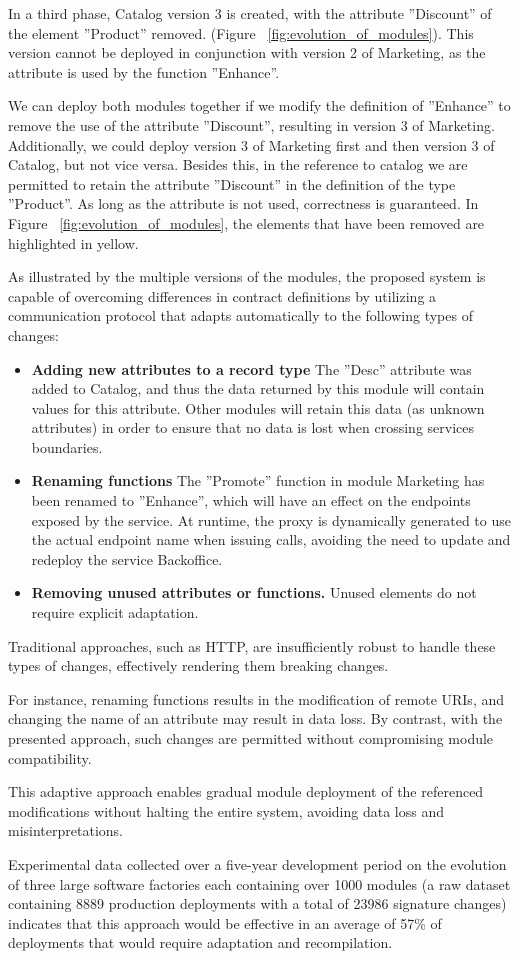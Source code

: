 In a third phase, Catalog version 3 is created, with the attribute ''Discount'' of the element ''Product'' removed.  (Figure ~\ref{fig:evolution_of_modules}).
This version cannot be deployed in conjunction with version 2 of Marketing, as the attribute is used by the function ''Enhance''.

We can deploy both modules together if we modify the definition of ''Enhance'' to remove the use of the attribute ''Discount'', resulting in version 3 of Marketing.
Additionally, we could deploy version 3 of Marketing first and then version 3 of Catalog, but not vice versa.
Besides this, in the reference to catalog we are permitted to retain the attribute ''Discount'' in the definition of the type ''Product''.
As long as the attribute is not used, correctness is guaranteed.
In Figure ~\ref{fig:evolution_of_modules}, the elements that have been removed are highlighted in yellow.

As illustrated by the multiple versions of the modules,
the proposed system is capable of overcoming differences in contract definitions by utilizing a communication protocol
that adapts automatically to the following types of changes:

\begin{itemize}
    \item \textbf{Adding new attributes to a record type} The ''Desc'' attribute was added to Catalog, and thus the data returned by this module will contain values for this attribute.
    Other modules will retain this data (as unknown attributes) in order to ensure that no data is lost when crossing services boundaries.
    \item \textbf{Renaming functions} The ''Promote'' function in module Marketing has been renamed to ''Enhance'', which will have an effect on the endpoints exposed by the service.
    At runtime, the proxy is dynamically generated to use the actual endpoint name when issuing calls, avoiding the need to update and redeploy the service Backoffice.
    \item \textbf{Removing unused attributes or functions.} Unused elements do not require explicit adaptation.
\end{itemize}

Traditional approaches, such as HTTP, are insufficiently robust to handle these types of changes, effectively rendering them breaking changes.

For instance, renaming functions results in the modification of remote URIs, and changing the name of an attribute may result in data loss.
By contrast, with the presented approach, such changes are permitted without compromising module compatibility.

This adaptive approach enables gradual module deployment of the referenced modifications without halting the entire system, avoiding data loss and misinterpretations.

Experimental data \cite{seco2020robust} collected over a five-year development period on the evolution of three large software factories each containing over 1000 modules
(a raw dataset containing 8889 production deployments with a total of 23986 signature changes)
indicates that this approach would be effective in an average of 57\% of deployments that would require adaptation and recompilation.